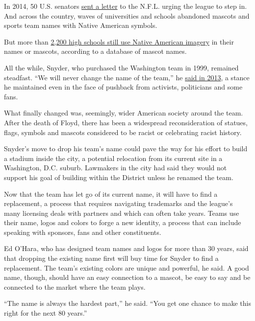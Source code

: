 In 2014, 50 U.S. senators
\href{https://www.nytimes3xbfgragh.onion/2014/05/22/sports/football/citing-nba-example-senators-urge-nfl-to-act-on-redskins-name.html}{sent
a letter} to the N.F.L. urging the league to step in. And across the
country, waves of universities and schools abandoned mascots and sports
team names with Native American symbols.

But more than
\href{https://www.nytimes3xbfgragh.onion/2020/07/10/sports/football/washington-redskins-name-change-mascots.html}{2,200
high schools still use Native American imagery} in their names or
mascots, according to a database of mascot names.

All the while, Snyder, who purchased the Washington team in 1999,
remained steadfast. ``We will never change the name of the team,'' he
\href{https://www.usatoday.com/story/sports/nfl/redskins/2013/05/09/washington-redskins-daniel-snyder/2148127/}{said
in 2013}, a stance he maintained even in the face of pushback from
activists, politicians and some fans.

What finally changed was, seemingly, wider American society around the
team. After the death of Floyd, there has been a widespread
reconsideration of statues, flags, symbols and mascots considered to be
racist or celebrating racist history.

Snyder's move to drop his team's name could pave the way for his effort
to build a stadium inside the city, a potential relocation from its
current site in a Washington, D.C. suburb. Lawmakers in the city had
said they would not support his goal of building within the District
unless he renamed the team.

Now that the team has let go of its current name, it will have to find a
replacement, a process that requires navigating trademarks and the
league's many licensing deals with partners and which can often take
years. Teams use their name, logos and colors to forge a new identity, a
process that can include speaking with sponsors, fans and other
constituents.

Ed O'Hara, who has designed team names and logos for more than 30 years,
said that dropping the existing name first will buy time for Snyder to
find a replacement. The team's existing colors are unique and powerful,
he said. A good name, though, should have an easy connection to a
mascot, be easy to say and be connected to the market where the team
plays.

``The name is always the hardest part,'' he said. ``You get one chance
to make this right for the next 80 years.''

